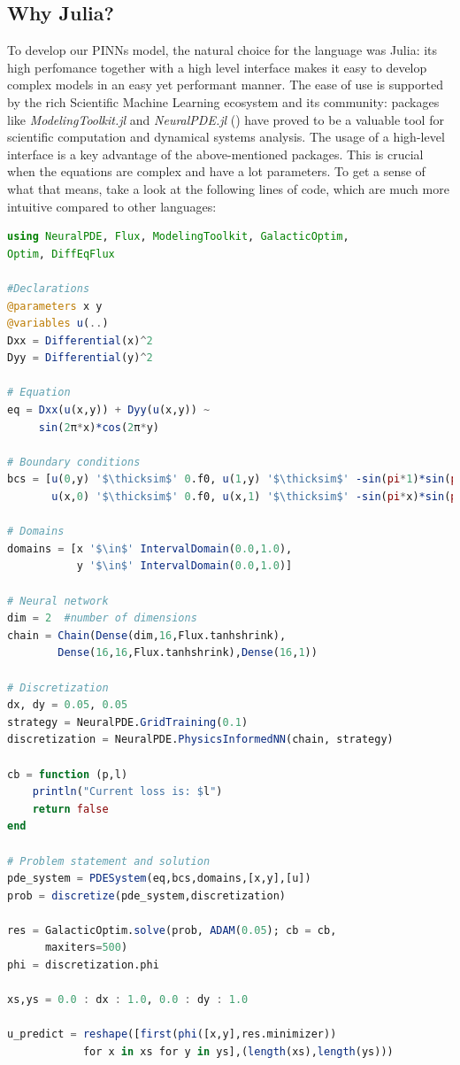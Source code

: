 \documentclass{juliacon}
\begin{document}
\subsection{Why Julia?}
To develop our PINNs model, the natural choice for the language was Julia: its high perfomance together with a high level interface makes it easy to develop complex models in an easy yet performant manner. The ease of use is supported by the rich Scientific Machine Learning ecosystem and its community: packages like \textit{ModelingToolkit.jl} and \textit{NeuralPDE.jl} (\cite{zubov2021neuralpde}) have proved to be a valuable tool for scientific computation and dynamical systems analysis.
The usage of a high-level interface is a key advantage of the above-mentioned packages. This is crucial when the equations are complex and have a lot parameters. To get a sense of what that means, take a look at the following lines of code, which are much more intuitive compared to other languages:

\lstset{escapeinside=''}
\begin{lstlisting}[language = Julia]
using NeuralPDE, Flux, ModelingToolkit, GalacticOptim, 
Optim, DiffEqFlux

#Declarations
@parameters x y 
@variables u(..)
Dxx = Differential(x)^2
Dyy = Differential(y)^2

# Equation
eq = Dxx(u(x,y)) + Dyy(u(x,y)) ~ 
     sin(2π*x)*cos(2π*y)

# Boundary conditions
bcs = [u(0,y) '$\thicksim$' 0.f0, u(1,y) '$\thicksim$' -sin(pi*1)*sin(pi*y),
       u(x,0) '$\thicksim$' 0.f0, u(x,1) '$\thicksim$' -sin(pi*x)*sin(pi*1)]

# Domains
domains = [x '$\in$' IntervalDomain(0.0,1.0),
           y '$\in$' IntervalDomain(0.0,1.0)]

# Neural network
dim = 2  #number of dimensions
chain = Chain(Dense(dim,16,Flux.tanhshrink),
        Dense(16,16,Flux.tanhshrink),Dense(16,1))

# Discretization
dx, dy = 0.05, 0.05
strategy = NeuralPDE.GridTraining(0.1)
discretization = NeuralPDE.PhysicsInformedNN(chain, strategy)

cb = function (p,l)
    println("Current loss is: $l")
    return false
end

# Problem statement and solution
pde_system = PDESystem(eq,bcs,domains,[x,y],[u])
prob = discretize(pde_system,discretization)

res = GalacticOptim.solve(prob, ADAM(0.05); cb = cb,
      maxiters=500)
phi = discretization.phi

xs,ys = 0.0 : dx : 1.0, 0.0 : dy : 1.0

u_predict = reshape([first(phi([x,y],res.minimizer))
            for x in xs for y in ys],(length(xs),length(ys)))
\end{lstlisting}
\end{document}
